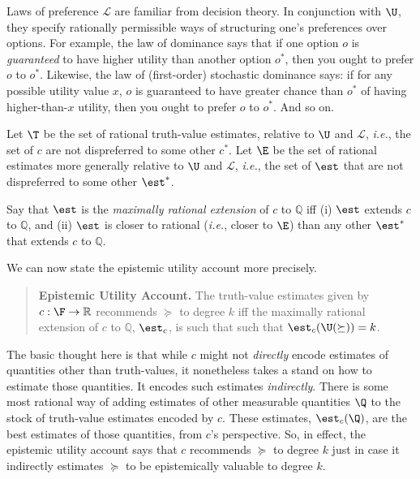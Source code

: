 Laws of preference $\mathcal{L}$ are familiar from decision theory. In conjunction with $\U$, they specify rationally permissible ways of structuring one's preferences over options. For example, the law of dominance says that if one option $o$ is \textit{guaranteed} to have higher utility than another option $o^*$, then you ought to prefer $o$ to $o^*$. Likewise, the law of (first-order) stochastic dominance says: if for any possible utility value $x$, $o$ is guaranteed to have greater chance than $o^*$ of having higher-than-$x$ utility, then you ought to prefer $o$ to $o^*$. And so on.

Let $\T$ be the set of rational truth-value estimates, relative to $\U$ and $\mathcal{L}$, \textit{i.e.}, the set of $c$ are not dispreferred to some other $c^*$. Let $\E$ be the set of rational estimates more generally relative to $\U$ and $\mathcal{L}$, \textit{i.e.}, the set of $\est$ that are not dispreferred to some other $\est^*$.

Say that $\est$ is the \textit{maximally rational extension} of $c$ to $\mathbb{Q}$ iff (i) $\est$ extends $c$ to $\mathbb{Q}$, and (ii) $\est$ is closer to rational (\textit{i.e.}, closer to $\E$) than any other $\est^*$ that extends $c$ to $\mathbb{Q}$.

We can now state the epistemic utility account more precisely.
\begin{quote}
\textbf{Epistemic Utility Account.} The truth-value estimates given by $c:\F\rightarrow\mathbb{R}$ recommends $\succeq$ to degree $k$ iff the maximally rational extension of $c$ to $\mathbb{Q}$, $\est_c$, is such that such that $\est_c(\U(\succeq))=k$.
\end{quote}
The basic thought here is that while $c$ might not \textit{directly} encode estimates of quantities other than truth-values, it nonetheless takes a stand on how to estimate those quantities. It encodes such estimates \textit{indirectly}. There is some most rational way of adding estimates of other measurable quantities $\Q$ to the stock of truth-value estimates encoded by $c$. These estimates, $\est_c(\Q)$, are the best estimates of those quantities, from $c$'s perspective. So, in effect, the epistemic utility account says that $c$ recommends $\succeq$ to degree $k$ just in case it indirectly estimates $\succeq$ to be epistemically valuable to degree $k$.

